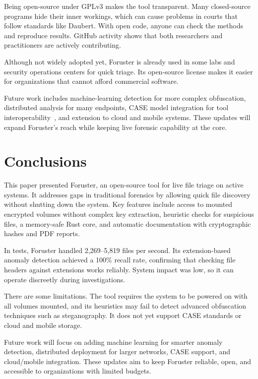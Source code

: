 \documentclass[preprint,12pt,a4paper]{elsarticle}
\begin{document}
Being open-source under GPLv3 makes the tool transparent. Many closed-source programs hide their inner workings, which can cause problems in courts that follow standards like Daubert. With open code, anyone can check the methods and reproduce results. GitHub activity shows that both researchers and practitioners are actively contributing.

Although not widely adopted yet, Foruster is already used in some labs and security operations centers for quick triage. Its open-source license makes it easier for organizations that cannot afford commercial software.

Future work includes machine-learning detection for more complex obfuscation, distributed analysis for many endpoints, CASE model integration for tool interoperability~\cite{case_dfrws_standard}, and extension to cloud and mobile systems. These updates will expand Foruster's reach while keeping live forensic capability at the core.

\section{Conclusions}

This paper presented Foruster, an open-source tool for live file triage on active systems. It addresses gaps in traditional forensics by allowing quick file discovery without shutting down the system. Key features include access to mounted encrypted volumes without complex key extraction, heuristic checks for suspicious files, a memory-safe Rust core, and automatic documentation with cryptographic hashes and PDF reports.

In tests, Foruster handled 2,269–5,819 files per second. Its extension-based anomaly detection achieved a 100\% recall rate, confirming that checking file headers against extensions works reliably. System impact was low, so it can operate discreetly during investigations.

There are some limitations. The tool requires the system to be powered on with all volumes mounted, and its heuristics may fail to detect advanced obfuscation techniques such as steganography. It does not yet support CASE standards or cloud and mobile storage.

Future work will focus on adding machine learning for smarter anomaly detection, distributed deployment for larger networks, CASE support, and cloud/mobile integration. These updates aim to keep Foruster reliable, open, and accessible to organizations with limited budgets.
\end{document}
